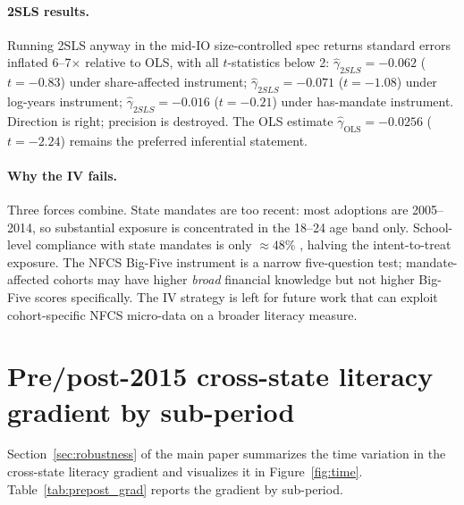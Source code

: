 \documentclass[12pt]{article}
\begin{document}
\paragraph{2SLS results.} Running 2SLS anyway in the mid-IO size-controlled spec returns standard errors inflated 6--7$\times$ relative to OLS, with all $t$-statistics below 2: $\hat\gamma_{2SLS} = -0.062$ ($t = -0.83$) under share-affected instrument; $\hat\gamma_{2SLS} = -0.071$ ($t = -1.08$) under log-years instrument; $\hat\gamma_{2SLS} = -0.016$ ($t = -0.21$) under has-mandate instrument. Direction is right; precision is destroyed. The OLS estimate $\hat\gamma_{\text{OLS}} = -0.0256$ ($t = -2.24$) remains the preferred inferential statement.

\paragraph{Why the IV fails.} Three forces combine. State mandates are too recent: most adoptions are 2005--2014, so substantial exposure is concentrated in the 18--24 age band only. School-level compliance with state mandates is only $\approx 48\%$ \citep{urban2020}, halving the intent-to-treat exposure. The NFCS Big-Five instrument is a narrow five-question test; mandate-affected cohorts may have higher \textit{broad} financial knowledge but not higher Big-Five scores specifically. The IV strategy is left for future work that can exploit cohort-specific NFCS micro-data on a broader literacy measure.

\section{Pre/post-2015 cross-state literacy gradient by sub-period}
\label{ia:prepost}

Section~\ref{sec:robustness} of the main paper summarizes the time variation in the cross-state literacy gradient and visualizes it in Figure~\ref{fig:time}. Table~\ref{tab:prepost_grad} reports the gradient by sub-period.
\end{document}

